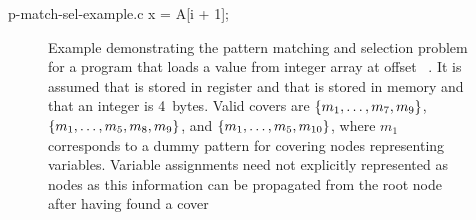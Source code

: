 \begin{filecontents*}{p-match-sel-example.c}
x = A[i + 1];
\end{filecontents*}

\begin{figure}
  \centering%
                {%
                  \begin{lstpage}{2.6cm}%
                  \end{lstpage}%
                }%
  \hfill%
  \hfill%

  \caption[Example of the pattern matching and selection problem]%
          {%
            Example demonstrating the pattern matching and selection problem for
            a program that loads a value from integer array  at offset
            \mbox{ \irCode*{\irAddText{}} }.
            It is assumed that  is
            stored in register and that  is stored in memory and that
            an integer is \num{4}~bytes.
            Valid covers are \mbox{$\mSet{m_1, \ldots, m_7, m_9}$},
            \mbox{$\mSet{m_1, \ldots, m_5, m_8, m_9}$}, and
            \mbox{$\mSet{m_1, \ldots, m_5, m_{10}}$}, where $m_1$ corresponds to
            a dummy pattern for covering nodes representing variables.
            Variable assignments need not explicitly represented as nodes as
            this information can be propagated from the root node after having
            found a cover%
          }
\end{figure}

